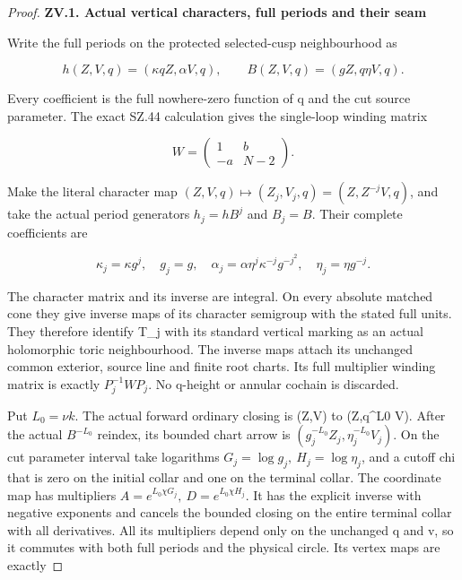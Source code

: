 \begin{proof}
\par

\medskip\noindent\textbf{ZV.1. Actual vertical characters, full periods and their seam}

\par\nopagebreak[4]

Write the full periods on the protected selected-cusp neighbourhood as

\[
 h(Z,V,q)=(\kappa qZ,\alpha V,q),\qquad
 B(Z,V,q)=(gZ,q\eta V,q).
\]

Every coefficient is the full nowhere-zero function of q and the cut
source parameter. The exact SZ.44 calculation gives the single-loop
winding matrix

\[
 W=\begin{pmatrix}1&b\\-a&N-2\end{pmatrix}.
\]

Make the literal character map \((Z,V,q)\mapsto(Z_j,V_j,q)=(Z,Z^{-j}V,q)\),
and take the actual period generators \(h_j=hB^j\) and \(B_j=B\). Their
complete coefficients are

\[
 \kappa_j=\kappa g^j,\quad g_j=g,\quad
 \alpha_j=\alpha\eta^j\kappa^{-j}g^{-j^2},\quad
 \eta_j=\eta g^{-j}.                                  \tag{ZV.3}
\]

The character matrix and its inverse are integral. On every absolute
matched cone they give inverse maps of its character semigroup with
the stated full units. They therefore identify T\_j with its standard
vertical marking as an actual holomorphic toric neighbourhood. The
inverse maps attach its unchanged common exterior, source line and
finite root charts. Its full multiplier winding matrix is exactly
\(P_j^{-1}WP_j\). No q-height or annular cochain is discarded.

Put \(L_0=\nu k\). The actual forward ordinary closing is (Z,V) to
(Z,q\^{}L0 V). After the actual \(B^{-L_0}\) reindex, its bounded chart arrow is
\((g_j^{-L_0}Z_j,\eta_j^{-L_0}V_j)\). On the cut parameter interval take
logarithms \(G_j=\log g_j,\ H_j=\log\eta_j\), and a cutoff chi that is zero
on the initial collar and one on the terminal collar. The coordinate
map has multipliers \(A=e^{L_0\chi G_j},\ D=e^{L_0\chi H_j}\).
It has the explicit inverse with negative exponents and cancels the
bounded closing on the entire terminal collar with all derivatives.
All its multipliers depend only on the unchanged q and v, so it
commutes with both full periods and the physical circle. Its vertex
maps are exactly


\end{proof}
